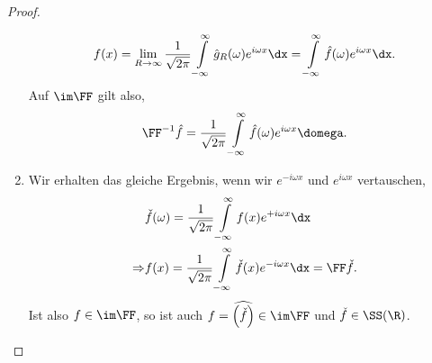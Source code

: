 \begin{proof}
\begin{enumerate}[label=\arabic{*}.)]
\begin{align*}
f(x) = \lim\limits_{R\to\infty} \frac{1}{\sqrt{2\pi}}
\int\limits_{-\infty}^\infty \hat{g}_R(\omega)e^{i\omega x}\dx
= 
\int\limits_{-\infty}^\infty \hat{f}(\omega)e^{i\omega x}\dx.
\end{align*}
Auf $\im\FF$ gilt also,
\begin{align*}
\FF^{-1}\hat{f} = \frac{1}{\sqrt{2\pi}} \int\limits_{-\infty}^\infty
\hat{f}(\omega) e^{i\omega x}\domega.
\end{align*}
\item Wir erhalten das gleiche Ergebnis, wenn wir $e^{-i\omega x}$ und
$e^{i\omega x}$ vertauschen,
\begin{align*}
&\check{f}(\omega) = \frac{1}{\sqrt{2\pi}}\int\limits_{-\infty}^\infty
f(x)e^{+i\omega x}\dx\\
\Rightarrow & f(x) = \frac{1}{\sqrt{2\pi}}\int\limits_{-\infty}^\infty
\check{f}(x)e^{-i\omega x}\dx = \FF\check{f}.
\end{align*}
Ist also $f\in\im\FF$, so ist auch $f =
\widehat{\left(\check{f}\right)}\in\im\FF$ und $\check{f}\in\SS(\R)$.\qedhere
\end{enumerate}
\end{proof}

